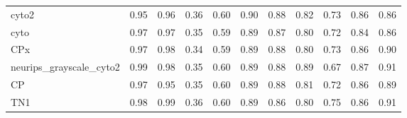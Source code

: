 \documentclass[./dissertation.tex]{subfiles}
\begin{document}
\begin{table}[htbp]
\begin{tabular}{|l|c|c|c|c|c|c|c|c|c|c|}
        cyto2                     & 0.95                                 & 0.96                                  & 0.36                                   & 0.60                                    & 0.90                                   & 0.88                                     & 0.82                                    & 0.73                                    & 0.86                                   & 0.86                                  \\
        cyto                      & 0.97                                 & 0.97                                  & 0.35                                   & 0.59                                    & 0.89                                   & 0.87                                     & 0.80                                    & 0.72                                    & 0.84                                   & 0.86                                  \\
        CPx                       & 0.97                                 & 0.98                                  & 0.34                                   & 0.59                                    & 0.89                                   & 0.88                                     & 0.80                                    & 0.73                                    & 0.86                                   & 0.90                                  \\
        neurips\_grayscale\_cyto2 & 0.99                                 & 0.98                                  & 0.35                                   & 0.60                                    & 0.89                                   & 0.88                                     & 0.89                                    & 0.67                                    & 0.87                                   & 0.91                                  \\
        CP                        & 0.97                                 & 0.95                                  & 0.35                                   & 0.60                                    & 0.89                                   & 0.88                                     & 0.81                                    & 0.72                                    & 0.86                                   & 0.89                                  \\
        TN1                       & 0.98                                 & 0.99                                  & 0.36                                   & 0.60                                    & 0.89                                   & 0.86                                     & 0.80                                    & 0.75                                    & 0.86                                   & 0.91                                  \\

\end{tabular}
\end{table}
\end{document}
